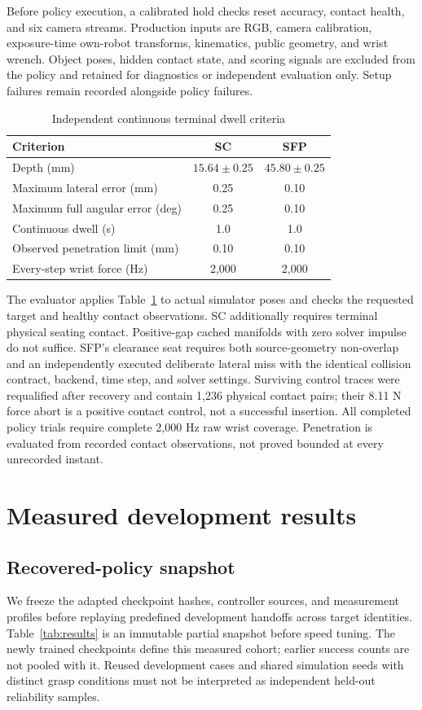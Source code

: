 \documentclass[letterpaper,10pt,conference]{ieeeconf}
\begin{document}
Before policy execution, a calibrated hold checks reset accuracy, contact
health, and six camera streams. Production inputs are RGB, camera calibration,
exposure-time own-robot transforms, kinematics, public geometry, and wrist
wrench. Object poses, hidden contact state, and scoring signals are excluded
from the policy and retained for diagnostics or independent evaluation only.
Setup failures remain recorded alongside policy failures.

\begin{table}[t]
\caption{Independent continuous terminal dwell criteria}
\label{tab:gates}
\centering\small
\setlength{\tabcolsep}{4pt}
\begin{tabular}{@{}lcc@{}}\toprule
Criterion&SC&SFP\\\midrule
Depth (mm)&$15.64\pm0.25$&$45.80\pm0.25$\\
Maximum lateral error (mm)&0.25&0.10\\
Maximum full angular error (deg)&0.25&0.10\\
Continuous dwell (s)&1.0&1.0\\
Observed penetration limit (mm)&0.10&0.10\\
Every-step wrist force (Hz)&2,000&2,000\\\bottomrule
\end{tabular}
\end{table}

The evaluator applies Table~\ref{tab:gates} to actual simulator poses and
checks the requested target and healthy contact observations. SC additionally
requires terminal physical seating contact. Positive-gap cached manifolds
with zero solver impulse do not suffice. SFP's clearance seat requires both
source-geometry non-overlap and an independently executed deliberate lateral
miss with the identical collision contract, backend, time step, and solver
settings. Surviving control traces were requalified after recovery and contain
1,236 physical contact pairs; their 8.11 N force abort is a positive contact
control, not a successful insertion. All completed policy trials require
complete 2,000 Hz raw wrist coverage. Penetration is evaluated from recorded
contact observations, not proved bounded at every unrecorded instant.

\section{Measured development results}
\subsection{Recovered-policy snapshot}
We freeze the adapted checkpoint hashes, controller sources, and measurement
profiles before replaying predefined development handoffs across target
identities. Table~\ref{tab:results} is an immutable partial snapshot before
speed tuning. The newly trained checkpoints define this measured cohort;
earlier success counts are not pooled with it. Reused development cases and
shared simulation seeds with distinct grasp conditions must not be
interpreted as independent held-out reliability samples.
\end{document}
